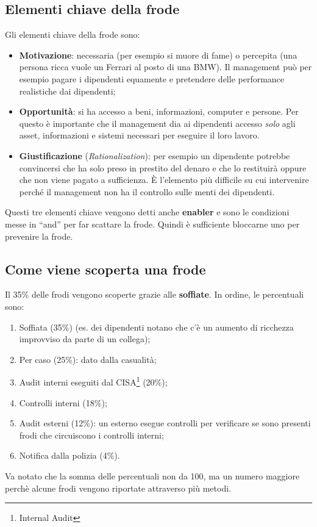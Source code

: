 \subsection{Elementi chiave della frode}

Gli elementi chiave della frode sono:
\begin{itemize}
  \item \textbf{Motivazione}: necessaria (per esempio si muore di fame)
  o percepita (una persona ricca vuole un Ferrari al posto di una BMW).
  Il management può per esempio pagare i dipendenti equamente e pretendere
  delle performance realistiche dai dipendenti;
  \item \textbf{Opportunità}: si ha accesso a beni, informazioni, computer e 
  persone. Per questo è importante che il management dia ai dipendenti
  accesso \emph{solo} agli asset, informazioni e sistemi necessari per
  eseguire il loro lavoro.
  \item \textbf{Giustificazione} (\emph{Rationalization}): 
  per esempio un dipendente potrebbe convincersi che ha solo preso 
  in prestito del denaro e che lo restituirà oppure che non viene 
  pagato a sufficienza. È l'elemento più difficile su cui intervenire
  perché il management non ha il controllo sulle menti dei dipendenti.
\end{itemize}
Questi tre elementi chiave vengono detti anche \textbf{enabler} e sono
le condizioni messe in ``and'' per far scattare la frode.
Quindi è sufficiente bloccarne uno per prevenire la frode.

\subsection{Come viene scoperta una frode}

Il 35\% delle frodi vengono scoperte grazie alle \textbf{soffiate}. In ordine,
le percentuali sono:
\begin{enumerate}
  \item Soffiata (35\%) (es. dei dipendenti notano che c'è un aumento di ricchezza 
  improvviso da parte di un collega);
  \item Per caso (25\%): dato dalla casualità;
  \item Audit interni eseguiti dal CISA\footnote{Internal Audit} (20\%);
  \item Controlli interni (18\%);
  \item Audit esterni (12\%): un esterno esegue controlli per verificare se 
  sono presenti frodi che circuiscono i controlli interni;
  \item Notifica dalla polizia (4\%).
\end{enumerate}
Va notato che la somma delle percentuali non da 100, ma un numero maggiore
perchè alcune frodi vengono riportate attraverso più metodi. 

